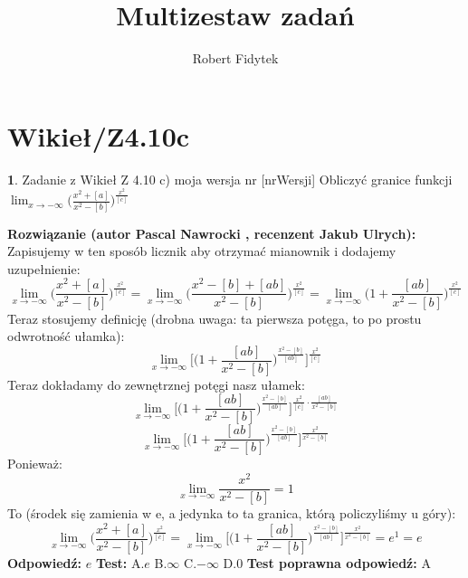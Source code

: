 \documentclass[12pt, a4paper]{article}
\title{Multizestaw zadań}
\author{Robert Fidytek}
\date{}
\theoremstyle{definition} %
\newtheorem{zad}{}
\newcommand{\kategoria}[1]{\section{#1}} %
\newcommand{\zadStart}[1]{\begin{zad}#1\newline} %
\newcommand{\zadStop}{\end{zad}}   %
\newcommand{\rozwStart}[2]{\noindent \textbf{Rozwiązanie (autor #1 , recenzent #2): }\newline} %
\newcommand{\odpStart}{\noindent \textbf{Odpowiedź:}\newline}    %
\newcommand{\odpStop}{\newline}                                             %
\newcommand{\testStart}{\noindent \textbf{Test:}\newline} %
\newcommand{\testStop}{\newline} %
\newcommand{\kluczStart}{\noindent \textbf{Test poprawna odpowiedź:}\newline} %
\newcommand{\kluczStop}{\newline} %
\begin{document}
\maketitle


\kategoria{Wikieł/Z4.10c}
\zadStart{Zadanie z Wikieł Z 4.10 c) moja wersja nr [nrWersji]}
Obliczyć granice funkcji $\displaystyle{\lim_{x \to -\infty}}\bigg(\frac{x^2+[a]}{x^2-[b]}\bigg)^{\frac{x^2}{[c]}}$
\zadStop
\rozwStart{Pascal Nawrocki}{Jakub Ulrych}
Zapisujemy w ten sposób licznik aby otrzymać mianownik i dodajemy uzupełnienie:
$$\displaystyle{\lim_{x \to -\infty}}\bigg(\frac{x^2+[a]}{x^2-[b]}\bigg)^{\frac{x^2}{[c]}}=\displaystyle{\lim_{x \to -\infty}}\bigg(\frac{x^2-[b]+[ab]}{x^2-[b]}\bigg)^{\frac{x^2}{[c]}}=\displaystyle{\lim_{x \to -\infty}}\bigg(1+\frac{[ab]}{x^2-[b]}\bigg)^{\frac{x^2}{[c]}}$$
Teraz stosujemy definicję (drobna uwaga: ta pierwsza potęga, to po prostu odwrotność ułamka):
$$\displaystyle{\lim_{x \to -\infty}}\bigg[\bigg(1+\frac{[ab]}{x^2-[b]}\bigg)^{\frac{x^2-[b]}{[ab]}}\bigg]^{\frac{x^2}{[c]}}$$
Teraz dokładamy do zewnętrznej potęgi nasz ułamek:
$$\displaystyle{\lim_{x \to -\infty}}\bigg[\bigg(1+\frac{[ab]}{x^2-[b]}\bigg)^{\frac{x^2-[b]}{[ab]}}\bigg]^{\frac{x^2}{[c]}\cdot\frac{[ab]}{x^2-[b]}}$$
$$\displaystyle{\lim_{x \to -\infty}}\bigg[\bigg(1+\frac{[ab]}{x^2-[b]}\bigg)^{\frac{x^2-[b]}{[ab]}}\bigg]^{\frac{x^2}{x^2-[b]}}$$
Ponieważ:
$$\displaystyle{\lim_{x \to -\infty}}\frac{x^2}{x^2-[b]}=1$$
To (środek się zamienia w e, a jedynka to ta granica, którą policzyliśmy u góry):
$$\displaystyle{\lim_{x \to -\infty}}\bigg(\frac{x^2+[a]}{x^2-[b]}\bigg)^{\frac{x^2}{[c]}}=\displaystyle{\lim_{x \to -\infty}}\bigg[\bigg(1+\frac{[ab]}{x^2-[b]}\bigg)^{\frac{x^2-[b]}{[ab]}}\bigg]^{\frac{x^2}{x^2-[b]}}=e^1=e$$
\odpStart
$e$
\odpStop
\testStart
A.$e$
B.$\infty$
C.$-\infty$
D.$0$
\testStop
\kluczStart
A
\kluczStop
\end{document}
